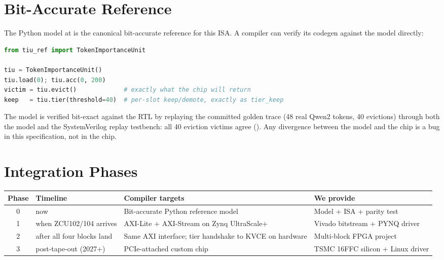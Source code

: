 \documentclass[11pt]{article}
\renewcommand{\arraystretch}{1.25}
\begin{document}
\section{Bit-Accurate Reference}
\label{sec:ref}

The Python model at  is the canonical
bit-accurate reference for this ISA. A compiler can verify its codegen against
the model directly:

\begin{lstlisting}[language=Python]
from tiu_ref import TokenImportanceUnit

tiu = TokenImportanceUnit()
tiu.load(0); tiu.acc(0, 200)
victim = tiu.evict()             # exactly what the chip will return
keep   = tiu.tier(threshold=40)  # per-slot keep/demote, exactly as tier_keep
\end{lstlisting}

\noindent The model is verified bit-exact against the RTL by replaying the
committed golden trace  (48 real Qwen2
tokens, 40 evictions) through both the model and the SystemVerilog replay
testbench: all 40 eviction victims agree
(). Any divergence between the model and
the chip is a bug in this specification, not in the chip.

\section{Integration Phases}
\label{sec:phases}

\begin{table}[ht]
\centering
\small
\renewcommand{\arraystretch}{1.25}
\begin{tabular}{@{}c p{3.0cm} p{4.0cm} p{5.0cm}@{}}
\toprule
Phase & Timeline & Compiler targets & We provide \\
\midrule
0 & now & Bit-accurate Python reference model & Model + ISA + parity test \\
1 & when ZCU102/104 arrives & AXI-Lite + AXI-Stream on Zynq UltraScale+ & Vivado bitstream + PYNQ driver \\
2 & after all four blocks land & Same AXI interface; tier handshake to KVCE on hardware & Multi-block FPGA project \\
3 & post-tape-out (2027+) & PCIe-attached custom chip & TSMC 16FFC silicon + Linux driver \\
\bottomrule
\end{tabular}
\end{table}
\end{document}
